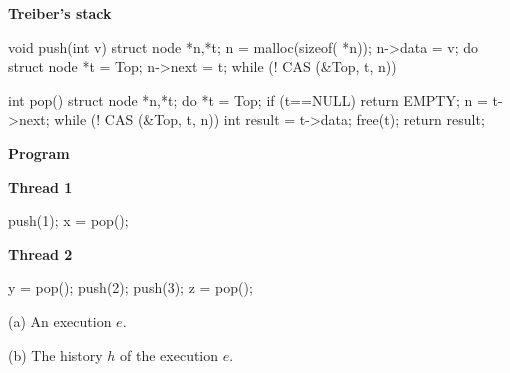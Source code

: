 \begin{figure*}[t]
  \lstset{numbers=left, 
          numberstyle=\tiny\tt, 
          stepnumber=1, 
          firstnumber=1,
          numbersep=4pt}
  \footnotesize
    \lstset{numbers=none}
  \begin{minipage}[c]{50mm}
    {\normalsize \textbf{Treiber's stack}}
    \begin{program}
void push(int v) {
  struct node *n,*t;
  n = malloc(sizeof( *n));
  n->data = v;
  do {
    struct node *t = Top;
    n->next = t;
  } while (! CAS (&Top, t, n))
}

int pop() {
  struct node *n,*t;
  do {
    *t = Top;
    if (t==NULL)
      return EMPTY;
    n = t->next;
  } while (! CAS (&Top, t, n))
  int result = t->data;
  free(t);
  return result;
}
    \end{program}
    {\normalsize\bf Program} \\[1mm]
    \begin{minipage}[b]{17mm}
      \textbf{Thread 1}
      \begin{program}
push(1);
x = pop();
      \end{program}
      \vspace{6.3mm}
    \end{minipage}
    \begin{minipage}[b]{16mm}
      \textbf{Thread 2}
      \begin{program}
y = pop();
push(2);
push(3);
z = pop();
      \end{program}
    \end{minipage}
  \end{minipage}
  \begin{minipage}[c]{120mm}

    
    
    \vspace{-2mm}
    \hspace{5cm}(a) An execution $e$.
    
    \medskip
    \begin{minipage}[c]{7cm}
    

    \centering
    \vspace{4mm}
    (b) The history $h$ of the execution $e$.
    \end{minipage}
    \begin{minipage}[c]{4cm}
    \centering
    


\end{minipage}
\end{minipage}
\end{figure*}
